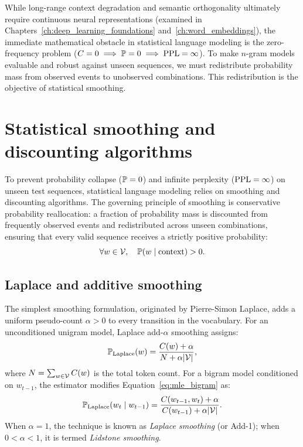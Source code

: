\documentclass[../../main.tex]{subfiles}
\begin{document}
While long-range context degradation and semantic orthogonality ultimately require continuous neural representations (examined in Chapters~\ref{ch:deep_learning_foundations} and~\ref{ch:word_embeddings}), the immediate mathematical obstacle in statistical language modeling is the zero-frequency problem ($C=0 \implies \mathbb{P}=0 \implies \mathrm{PPL}=\infty$). To make $n$-gram models evaluable and robust against unseen sequences, we must redistribute probability mass from observed events to unobserved combinations. This redistribution is the objective of statistical smoothing.

\clearpage
\section{Statistical smoothing and discounting algorithms}
\label{sec:smoothing}

To prevent probability collapse ($\mathbb{P}=0$) and infinite perplexity ($\mathrm{PPL}=\infty$) on unseen test sequences, statistical language modeling relies on smoothing and discounting algorithms. The governing principle of smoothing is conservative probability reallocation: a fraction of probability mass is discounted from frequently observed events and redistributed across unseen combinations, ensuring that every valid sequence receives a strictly positive probability:
\[
\forall w \in \mathcal{V}, \quad \mathbb{P}(w \mid \text{context}) > 0.
\]

\subsection{Laplace and additive smoothing}
The simplest smoothing formulation, originated by Pierre-Simon Laplace, adds a uniform pseudo-count $\alpha > 0$ to every transition in the vocabulary. For an unconditioned unigram model, Laplace add-$\alpha$ smoothing assigns:
\begin{equation}
\label{eq:laplace_unigram}
\mathbb{P}_{\text{Laplace}}(w) = \frac{C(w) + \alpha}{N + \alpha |\mathcal{V}|},
\end{equation}
where $N = \sum_{w \in \mathcal{V}} C(w)$ is the total token count. For a bigram model conditioned on $w_{t-1}$, the estimator modifies Equation~\eqref{eq:mle_bigram} as:
\begin{equation}
\label{eq:laplace_bigram}
\mathbb{P}_{\text{Laplace}}(w_t \mid w_{t-1}) = \frac{C(w_{t-1}, w_t) + \alpha}{C(w_{t-1}) + \alpha |\mathcal{V}|}.
\end{equation}
When $\alpha = 1$, the technique is known as \emph{Laplace smoothing} (or Add-1); when $0 < \alpha < 1$, it is termed \emph{Lidstone smoothing}.
\end{document}
